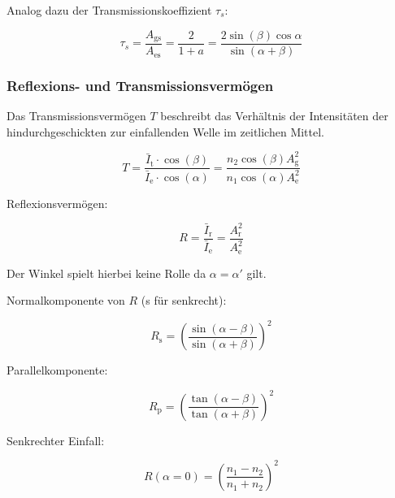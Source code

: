 \documentclass[a4paper, 11pt, ngerman, parskip=half]{scrartcl}
\begin{document}
Analog dazu der Transmissionskoeffizient $\tau_s$:

\begin{equation}
    \label{eq:transmissionskoeffizient}
    \tau_s = \frac{A_{\text{gs}}}{A_{\text{es}}} = \frac{2}{1+a} = \frac{2 \sin (\beta) \cos{\alpha}}{\sin (\alpha + \beta)}
\end{equation}

\subsubsection*{Reflexions- und Transmissionsvermögen}
Das Transmissionsvermögen $T$ beschreibt das Verhältnis der Intensitäten der hindurchgeschickten zur einfallenden Welle im zeitlichen Mittel.

\begin{equation}
    \label{eq:transmissionsvermoegen}
    T = \frac{\bar{I}_{\text{t}} \cdot \cos (\beta)}{\bar{I}_{\text{e}}\cdot \cos (\alpha)} = \frac{n_2 \cos (\beta) A_{\text{g}}^2}{n_1 \cos (\alpha) A_{\text{e}}^2}
\end{equation}

Reflexionsvermögen:

\begin{equation}
    \label{eq:reflexionsvermoegen}
    R = \frac{\bar{I}_{\text{r}}}{\bar{I}_{\text{e}}} = \frac{A_{\text{r}}^2}{A_{\text{e}}^2}
\end{equation}

Der Winkel spielt hierbei keine Rolle da $\alpha = \alpha'$ gilt.

Normalkomponente von $R$ (s für senkrecht):

\begin{equation}
    \label{eq:reflexionsvermoegen_senkrecht}
    R_{\text{s}} = \left( \frac{\sin(\alpha - \beta)}{\sin(\alpha + \beta)} \right)^2
\end{equation}

Parallelkomponente:

\begin{equation}
    \label{eq:reflexionsvermoegen_parallel}
    R_{\text{p}} = \left( \frac{\tan(\alpha - \beta)}{\tan(\alpha + \beta)} \right)^2
\end{equation}

Senkrechter Einfall:

\begin{equation}
    \label{eq:reflexionsvermoegen_senkrechter_einfall}
    R(\alpha = 0) = \left( \frac{n_1 - n_2}{n_1 + n_2} \right)^2
\end{equation}
\end{document}
